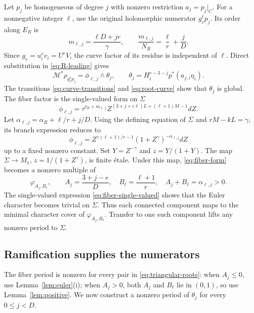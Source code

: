 \documentclass[11pt]{article}
\numberwithin{equation}{section}
\theoremstyle{definition}
\theoremstyle{remark}
\begin{document}
Let $p_j$ be homogeneous of degree $j$ with nonzero
restriction $a_j=p_j|_C$. For a nonnegative integer $\ell$,
use the original holomorphic numerator $g_e^\ell p_j$.
Its order along $E_R$ is
\begin{equation}\label{eq:numerator-order}
 m_{\ell,j}=\frac{\ell D+jr}{\gamma},\qquad
 \frac{m_{\ell,j}}{N_R}=\frac\ell r+\frac jD.
\end{equation}
Since $g_e=u_i^ev_i=U^eV$, the curve factor of its residue
is independent of $\ell$. Direct substitution in
\eqref{eq:R-leading} gives
\begin{equation}\label{eq:residue-product}
 \mathcal M^*\rho_{g_e^\ell p_j}
     =\phi_{\ell,j}\wedge\theta_j,\qquad
 \theta_j=H_i^{e-3-j}p^*(a_{j,i}\eta_i).
\end{equation}
The transitions \eqref{eq:curve-transitions} and
\eqref{eq:root-curve} show that $\theta_j$ is global.
The fiber factor is the single-valued form on $\Sigma$
\begin{equation}\label{eq:fiber-single-valued}
 \phi_{\ell,j}
   =\tau^{\nu_R+m_{\ell,j}}
      Z^{(3+j+e\ell)L+(\ell+1)M-1}dZ.
\end{equation}
Let $\alpha_{\ell,j}=\alpha_R+\ell/r+j/D$.
Using the defining equation of $\Sigma$ and
$rM-kL=\gamma$, its branch expression reduces to
\begin{equation}\label{eq:fiber-form}
 \phi_{\ell,j}
   =Z^{\gamma(\ell+1)/r-1}(1+Z^\gamma)^{-\alpha_{\ell,j}}dZ
\end{equation}
up to a fixed nonzero constant.
Set $Y=Z^{-\gamma}$ and $z=Y/(1+Y)$. The map
$\Sigma\to M_1$, $z=1/(1+Z^\gamma)$, is finite \'etale.
Under this map,
\eqref{eq:fiber-form} becomes a nonzero multiple of
\begin{equation}\label{eq:fiber-Euler}
 \varphi_{A_j,B_\ell},\qquad
 A_j=\frac{3+j-e}{D},\quad B_\ell=\frac{\ell+1}{r},\quad
 A_j+B_\ell=\alpha_{\ell,j}>0.
\end{equation}
The single-valued expression \eqref{eq:fiber-single-valued}
shows that the Euler character becomes trivial on
$\Sigma$. Thus each connected component maps to the
minimal character cover of $\varphi_{A_j,B_\ell}$.
Transfer to one such component lifts any nonzero period
to $\Sigma$.

\subsection{Ramification supplies the numerators}

The fiber period is nonzero for every pair in
\eqref{eq:triangular-roots}: when $A_j\le0$, use
Lemma~\ref{lem:euler}(i); when $A_j>0$, both $A_j$ and
$B_\ell$ lie in $(0,1)$, so use Lemma~\ref{lem:positive}.
We now construct a nonzero period of $\theta_j$ for every
$0\le j<D$.
\end{document}
